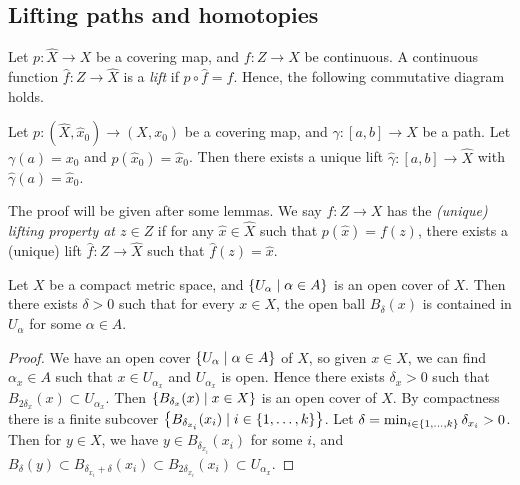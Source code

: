 \subsection{Lifting paths and homotopies}
\begin{definition}
	Let \( p \colon \hat X \to X \) be a covering map, and \( f \colon Z \to X \) be continuous.
	A continuous function \( \hat f \colon Z \to \hat X \) is a \emph{lift} if \( p \circ \hat f = f \).
	Hence, the following commutative diagram holds.
	\begin{center}
	\end{center}
\end{definition}
\begin{theorem}
	Let \( p \colon (\hat X, \hat x_0) \to (X, x_0) \) be a covering map, and \( \gamma \colon [a,b] \to X \) be a path.
	Let \( \gamma(a) = x_0 \) and \( p(\hat x_0) = \hat x_0 \).
	Then there exists a unique lift \( \hat\gamma \colon [a,b] \to \hat X \) with \( \hat \gamma(a) = \hat x_0 \).
\end{theorem}
The proof will be given after some lemmas.
We say \( f \colon Z \to X \) has the \emph{(unique) lifting property at \( z \in Z \)} if for any \( \hat x \in \hat X \) such that \( p(\hat x) = f(z) \), there exists a (unique) lift \( \hat f \colon Z \to \hat X \) such that \( \hat f(z) = \hat x \).
\begin{lemma}
	Let \( X \) be a compact metric space, and \( \qty{U_\alpha \mid \alpha \in A} \) is an open cover of \( X \).
	Then there exists \( \delta > 0 \) such that for every \( x \in X \), the open ball \( B_\delta(x) \) is contained in \( U_\alpha \) for some \( \alpha \in A \).
\end{lemma}
\begin{proof}
	We have an open cover \( \qty{U_\alpha \mid \alpha \in A} \) of \( X \), so given \( x \in X \), we can find \( \alpha_x \in A \) such that \( x \in U_{\alpha_x} \) and \( U_{\alpha_x} \) is open.
	Hence there exists \( \delta_x > 0 \) such that \( B_{2\delta_x}(x) \subset U_{\alpha_x} \).
	Then \( \qty{B_{\delta_x}(x) \mid x \in X} \) is an open cover of \( X \).
	By compactness there is a finite subcover \( \qty{B_{\delta_{x_i}}(x_i) \mid i \in \qty{1, \dots, k}} \).
	Let \( \delta = \min_{i \in \qty{1, \dots, k}} \delta_{x_i} > 0 \).
	Then for \( y \in X \), we have \( y \in B_{\delta_{x_i}}(x_i) \) for some \( i \), and \( B_\delta(y) \subset B_{\delta_{x_i} + \delta}(x_i) \subset B_{2\delta_{x_i}}(x_i) \subset U_{\alpha_x} \).
\end{proof}
